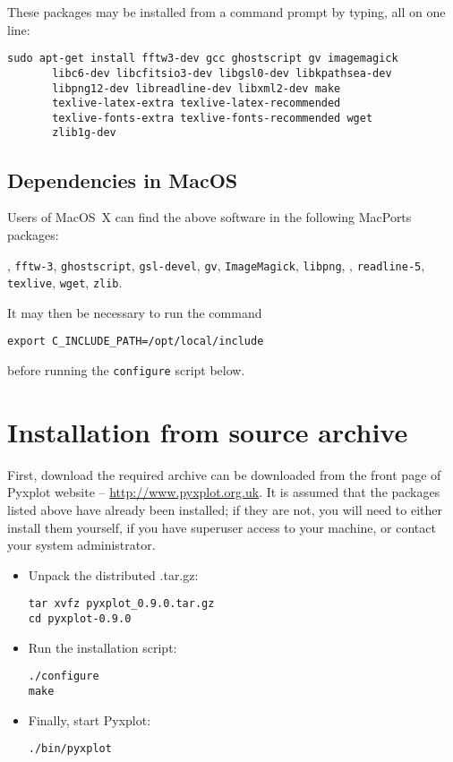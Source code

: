 \noindent These packages may be installed from a command prompt by typing, all on one line:

\begin{verbatim}
sudo apt-get install fftw3-dev gcc ghostscript gv imagemagick
       libc6-dev libcfitsio3-dev libgsl0-dev libkpathsea-dev
       libpng12-dev libreadline-dev libxml2-dev make
       texlive-latex-extra texlive-latex-recommended
       texlive-fonts-extra texlive-fonts-recommended wget
       zlib1g-dev
\end{verbatim}

\subsection{Dependencies in MacOS}

Users of MacOS~X can find the above software in the following MacPorts packages:

\vspace{2mm}
, {\tt fftw-3}, {\tt ghostscript}, {\tt gsl-devel}, {\tt gv}, {\tt ImageMagick}, {\tt libpng},\newline
{}, {\tt readline-5}, {\tt texlive}, {\tt wget}, {\tt zlib}.
\vspace{2mm}

It may then be necessary to run the command
\begin{verbatim}
export C_INCLUDE_PATH=/opt/local/include
\end{verbatim}
before running the {\tt configure} script below.

\section{Installation from source archive}

First, download the required archive can be downloaded from the front page of
Pyxplot website -- \url{http://www.pyxplot.org.uk}. It is assumed that the
packages listed above have already been installed; if they are not, you will
need to either install them yourself, if you have superuser access to your
machine, or contact your system administrator.

\begin{itemize}
\item Unpack the distributed .tar.gz:

\begin{verbatim}
tar xvfz pyxplot_0.9.0.tar.gz
cd pyxplot-0.9.0
\end{verbatim}

\item Run the installation script:

\begin{verbatim}
./configure
make
\end{verbatim}

\item Finally, start Pyxplot:

\begin{verbatim}
./bin/pyxplot
\end{verbatim}

\end{itemize}

